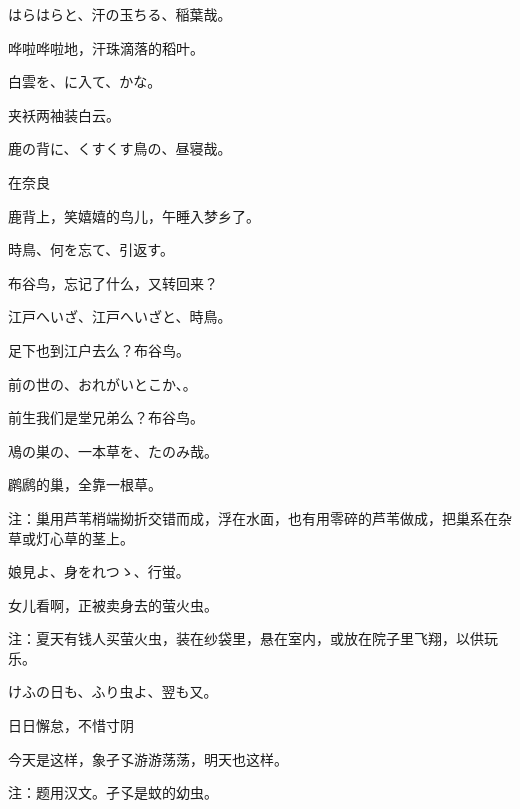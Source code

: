 \begin{haiku}
    {\FH はらはらと、汗の玉ちる、稲葉哉。}

    {\FK 哗啦哗啦地，汗珠滴落的稻叶。}
\end{haiku}

\begin{haiku}
    {\FH 白雲を、に入て、かな。}

    {\FK 夹袄两袖装白云。}
\end{haiku}

\begin{haiku}
    {\FH 鹿の背に、くすくす鳥の、昼寝哉。}

    {\FK 在奈良}

    {\FK 鹿背上，笑嬉嬉的鸟儿，午睡入梦乡了。}
\end{haiku}

\begin{haiku}
    {\FH 時鳥、何を忘て、引返す。}

    {\FK 布谷鸟，忘记了什么，又转回来？}
\end{haiku}

\begin{haiku}
    {\FH 江戸へいざ、江戸へいざと、時鳥。}

    {\FK 足下也到江户去么？布谷鸟。}
\end{haiku}

\begin{haiku}
    {\FH 前の世の、おれがいとこか、。}

    {\FK 前生我们是堂兄弟么？布谷鸟。}
\end{haiku}

\begin{haiku}
    {\FH 鳰の巣の、一本草を、たのみ哉。}

    {\FK 䴙䴘的巢，全靠一根草。}

    {\FT 注：巢用芦苇梢端拗折交错而成，浮在水面，也有用零碎的芦苇做成，把巢系在杂草或灯心草的茎上。}
\end{haiku}

\begin{haiku}
    {\FH 娘見よ、身をれつゝ、行蛍。}

    {\FK 女儿看啊，正被卖身去的萤火虫。}

    {\FT 注：夏天有钱人买萤火虫，装在纱袋里，悬在室内，或放在院子里飞翔，以供玩乐。}
\end{haiku}

\begin{haiku}
    {\FH けふの日も、ふり虫よ、翌も又。}

    {\FK 日日懈怠，不惜寸阴}

    {\FK 今天是这样，象孑孓游游荡荡，明天也这样。}

    {\FT 注：题用汉文。孑孓是蚊的幼虫。}
\end{haiku}

